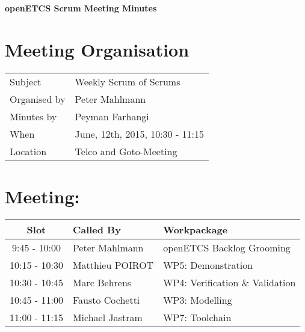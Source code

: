 \documentclass[a4paper, 11pt]{article}
\begin{document}
{\begin{center}\huge\bf openETCS Scrum Meeting Minutes\end{center}}
\section{Meeting Organisation}

\renewcommand{\arraystretch}{1.5}
\begin{supertabular}{m{.2\textwidth}m{.8\textwidth}}
Subject & Weekly Scrum of Scrums\\
Organised by &Peter Mahlmann\\
Minutes by & Peyman Farhangi\\
When & June, 12th, 2015, 10:30 - 11:15\\
Location & Telco and Goto-Meeting\\
\end{supertabular}

\renewcommand{\arraystretch}{1.0}
\section{Meeting:}

\begin{tabular}{|c|l|l|}
\hline
\textbf{Slot} &  \textbf{Called By} & \textbf{Workpackage} \\
\hline  
9:45 - 10:00 & Peter Mahlmann & openETCS Backlog Grooming  \\\hline
10:15 - 10:30 & Matthieu POIROT & WP5: Demonstration \\\hline  
10:30 - 10:45 & Marc Behrens & WP4: Verification \& Validation \\\hline  
10:45 - 11:00 & Fausto Cochetti & WP3: Modelling \\\hline  
11:00 - 11:15 & Michael Jastram  & WP7: Toolchain \\\hline
\end{tabular}
\end{document}
